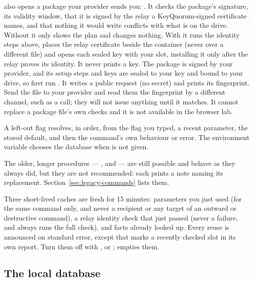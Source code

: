  also opens a package your provider sends you:
. It checks
the package's signature, its validity window, that it is signed by the relay a
KeyQuorum-signed certificate names, and that nothing it would write conflicts
with what is on the drive. Without  it only shows the plan and
changes nothing. With  it runs the identity steps above, places the
relay certificate beside the container (never over a different file) and opens
each sealed key with your slot, installing it only after the relay proves its
identity. It never prints a key. The package is signed by your provider, and its setup steps and keys are
sealed to your key and bound to your drive, so first run . It writes a public request (no secret) and prints its
fingerprint. Send the file to your provider and read them the fingerprint by a
different channel, such as a call; they will not issue anything until it
matches. It cannot replace a package file's own checks
and it is not available in the browser lab.

A left-out flag resolves, in order, from the flag you typed, a recent
parameter, the stored default, and then the command's own behaviour or error.
The environment variable  chooses the database when
 is not given.

The older, longer procedures --- ,  and  --- are still possible and behave as
they always did, but they are not recommended: each prints a note naming its
replacement. Section~\ref{sec:legacy-commands} lists them.

\label{sec:caches}
Three short-lived caches are fresh for 15 minutes: parameters you just used (for
the same command only, and never a recipient or any target of an outward or
destructive command), a relay identity check that just passed (never a failure,
and  always runs the full check), and facts  already
looked up. Every reuse is announced on standard error, except that
 marks a recently checked slot in its own report. Turn them off with
,  or ;
 empties them.

\subsection{The local database}

